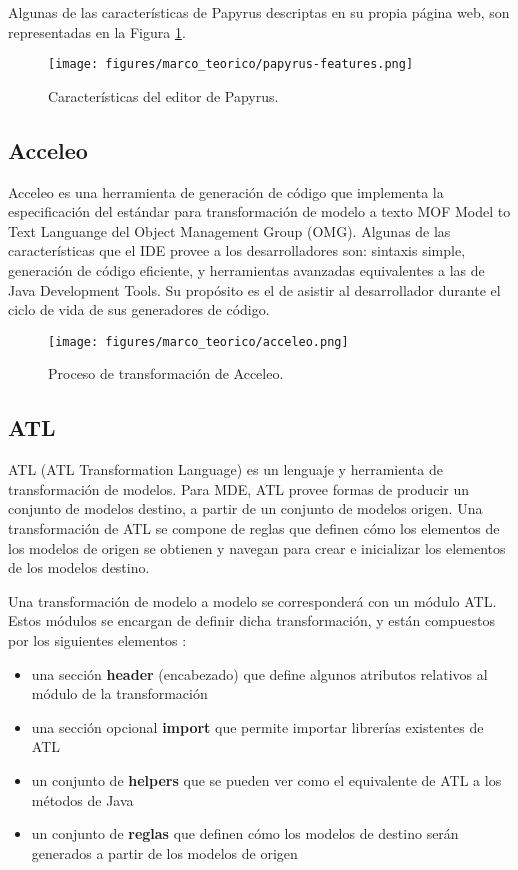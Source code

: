 Algunas de las características de Papyrus descriptas en su propia página web, son representadas en la Figura \ref{fig:marco:papyrus_editor}.

\begin{figure}[htbp]
    \centering
    \texttt{[image: figures/marco\_teorico/papyrus-features.png]}
    \caption{Características del editor de Papyrus. \cite{papyrus}}
    \label{fig:marco:papyrus_editor}
\end{figure}

\subsection{Acceleo}
Acceleo es una herramienta de generación de código que implementa la especificación del estándar para transformación de modelo a texto MOF Model to Text Languange del Object Management Group (OMG). Algunas de las características que el IDE provee a los desarrolladores son: sintaxis simple, generación de código eficiente, y herramientas avanzadas equivalentes a las de Java Development Tools. Su propósito es el de asistir al desarrollador durante el ciclo de vida de sus generadores de código. \cite{acceleo}

\begin{figure}[htbp]
    \centering
    \texttt{[image: figures/marco\_teorico/acceleo.png]}
    \caption{Proceso de transformación de Acceleo. \cite{acceleo}}
    \label{fig:marco:acceleo_transformation}
\end{figure}

\subsection{ATL}
ATL (ATL Transformation Language) es un lenguaje y herramienta de transformación de modelos. Para MDE, ATL provee formas de producir un conjunto de modelos destino, a partir de un conjunto de modelos origen. Una transformación de ATL se compone de reglas que definen cómo los elementos de los modelos de origen se obtienen y navegan para crear e inicializar los elementos de los modelos destino. \cite{atl}

Una transformación de modelo a modelo se corresponderá con un módulo ATL. Estos módulos se encargan de definir dicha transformación, y están compuestos por los siguientes elementos \cite{atloverview}:

\begin{itemize}
    \item una sección \textbf{header} (encabezado) que define algunos atributos relativos al módulo de la transformación
    \item una sección opcional \textbf{import} que permite importar librerías existentes de ATL
    \item un conjunto de \textbf{helpers} que se pueden ver como el equivalente de ATL a los métodos de Java
    \item un conjunto de \textbf{reglas} que definen cómo los modelos de destino serán generados a partir de los modelos de origen
\end{itemize}

